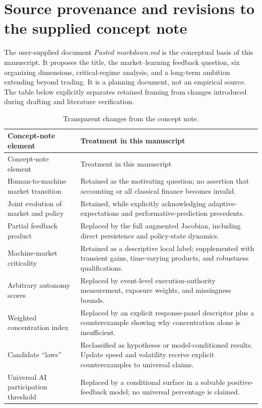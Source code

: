 \documentclass[11pt,a4paper]{article}
\theoremstyle{definition}
\theoremstyle{remark}
\begin{document}
\clearpage
\section{Source provenance and revisions to the supplied concept note}
\label{app:provenance}
The user-supplied document \emph{Pasted markdown.md} is the conceptual basis of this manuscript. It proposes the title, the market--learning feedback question, six organizing dimensions, critical-regime analysis, and a long-term ambition extending beyond trading. It is a planning document, not an empirical source. The table below explicitly separates retained framing from changes introduced during drafting and literature verification.

\begin{longtable}{p{}p{}}
\caption{Transparent changes from the concept note.}\label{tab:provenance}\\
\toprule
Concept-note element & Treatment in this manuscript \\
\midrule
\endfirsthead
\toprule Concept-note element & Treatment in this manuscript \\
\midrule
\endhead
\bottomrule
\endfoot
Human-to-machine market transition & Retained as the motivating question; no assertion that accounting or all classical finance becomes invalid.\\
Joint evolution of market and policy & Retained, while explicitly acknowledging adaptive-expectations and performative-prediction precedents.\\
Partial feedback product & Replaced by the full augmented Jacobian, including direct persistence and policy-state dynamics.\\
Machine-market criticality & Retained as a descriptive local label; supplemented with transient gains, time-varying products, and robustness qualifications.\\
Arbitrary autonomy scores & Replaced by event-level execution-authority measurement, exposure weights, and missingness bounds.\\
Weighted concentration index & Replaced by an explicit response-panel descriptor plus a counterexample showing why concentration alone is insufficient.\\
Candidate ``laws'' & Reclassified as hypotheses or model-conditioned results. Update speed and volatility receive explicit counterexamples to universal claims.\\
Universal AI participation threshold & Replaced by a conditional surface in a solvable positive-feedback model; no universal percentage is claimed.\\

\end{longtable}
\end{document}
